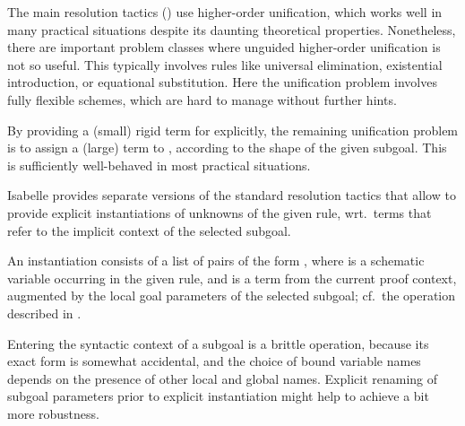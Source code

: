 \begin{isabellebody}
\begin{isamarkuptext}
\begin{description}
  \end{description}%
\end{isamarkuptext}%
\isamarkuptrue%
%
\endisatagmlref
{\isafoldmlref}%
%
\isadelimmlref
%
\endisadelimmlref
%
\isamarkuptrue%
%
\begin{isamarkuptext}%
The main resolution tactics ()
  use higher-order unification, which works well in many practical
  situations despite its daunting theoretical properties.
  Nonetheless, there are important problem classes where unguided
  higher-order unification is not so useful.  This typically involves
  rules like universal elimination, existential introduction, or
  equational substitution.  Here the unification problem involves
  fully flexible  schemes, which are hard to manage
  without further hints.

  By providing a (small) rigid term for  explicitly, the
  remaining unification problem is to assign a (large) term to , according to the shape of the given subgoal.  This is
  sufficiently well-behaved in most practical situations.

  \medskip Isabelle provides separate versions of the standard  resolution tactics that allow to provide explicit
  instantiations of unknowns of the given rule, wrt.\ terms that refer
  to the implicit context of the selected subgoal.

  An instantiation consists of a list of pairs of the form , where  is a schematic variable occurring in
  the given rule, and  is a term from the current proof
  context, augmented by the local goal parameters of the selected
  subgoal; cf.\ the  operation described in
  .

  Entering the syntactic context of a subgoal is a brittle operation,
  because its exact form is somewhat accidental, and the choice of
  bound variable names depends on the presence of other local and
  global names.  Explicit renaming of subgoal parameters prior to
  explicit instantiation might help to achieve a bit more robustness.


\end{isamarkuptext}
\end{isabellebody}
